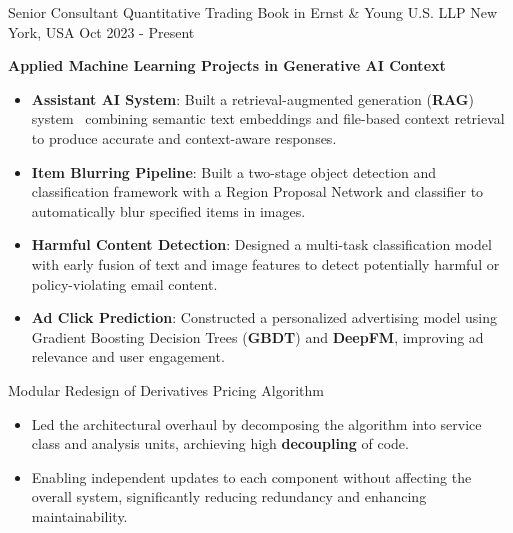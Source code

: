 

\begin{cventries}

  \cventry
    {Senior Consultant} %
    {Quantitative Trading Book in Ernst \& Young U.S. LLP} %
    {New York, USA} %
    {Oct 2023 - Present} %
    {
      \begin{cvitems}
        \item \textbf{Applied Machine Learning Projects in Generative AI Context}
        \begin{itemize}
          \item \textbf{Assistant AI System}: Built a retrieval-augmented generation (\textbf{RAG}) system \
          combining semantic text embeddings and file-based context retrieval to produce accurate and context-aware responses.
          \item \textbf{Item Blurring Pipeline}: Built a two-stage object detection and classification framework with a Region Proposal Network and classifier to automatically blur specified items in images.
          \item \textbf{Harmful Content Detection}: Designed a multi-task classification model with early fusion of text and image features to detect potentially harmful or policy-violating email content.
          \item \textbf{Ad Click Prediction}: Constructed a personalized advertising model using Gradient Boosting Decision Trees (\textbf{GBDT}) and \textbf{DeepFM}, improving ad relevance and user engagement.
        \end{itemize}
        \item Modular Redesign of Derivatives Pricing Algorithm
        \begin{itemize}
          \item Led the architectural overhaul by decomposing the algorithm into service class and analysis units, archieving high \textbf{decoupling} of code.
          \item Enabling independent updates to each component without affecting the overall system, significantly reducing redundancy and enhancing maintainability.

\end{itemize}
\end{cvitems}}
\end{cventries}
